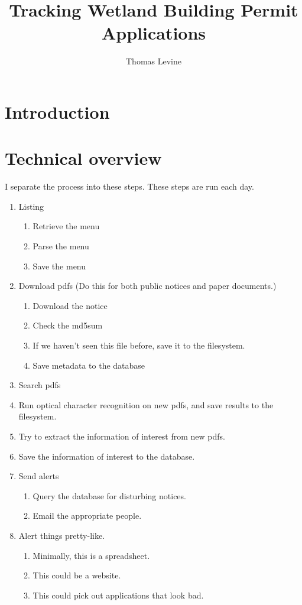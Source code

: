 \documentclass{article}
\title{Tracking Wetland Building Permit Applications}
\author{Thomas Levine}
\begin{document}
\maketitle

\section{Introduction}

\section{Technical overview}
I separate the process into these steps. These steps are run each day.

\begin{enumerate}
\item Listing
  \begin{enumerate}
  \item Retrieve the menu
  \item Parse the menu
  \item Save the menu
  \end{enumerate}
\item Download pdfs (Do this for both public notices and paper documents.)
  \begin{enumerate}
  \item Download the notice
  \item Check the md5sum
  \item If we haven't seen this file before, save it to the filesystem.
  \item Save metadata to the database
  \end{enumerate}
\item Search pdfs
  \item Run optical character recognition on new pdfs, and save results to the filesystem.
  \item Try to extract the information of interest from new pdfs.
  \item Save the information of interest to the database.
\item Send alerts
  \begin{enumerate}
  \item Query the database for disturbing notices.
  \item Email the appropriate people.
  \end{enumerate}
\item Alert things pretty-like.
  \begin{enumerate}
  \item Minimally, this is a spreadsheet.
  \item This could be a website.
  \item This could pick out applications that look bad.
  \end{enumerate}
\end{enumerate}
\end{document}
